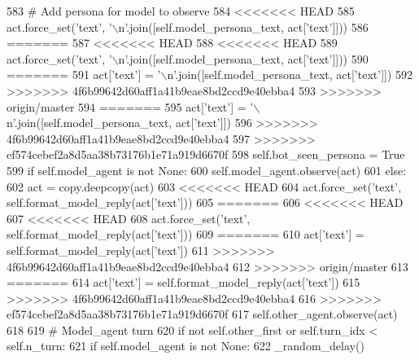\begin{DoxyCode}
583             \textcolor{comment}{# Add persona for model to observe}
584 <<<<<<< HEAD
585             act.force\_set(\textcolor{stringliteral}{'text'}, \textcolor{stringliteral}{'\(\backslash\)n'}.join([self.model\_persona\_text, act[\textcolor{stringliteral}{'text'}]]))
586 =======
587 <<<<<<< HEAD
588 <<<<<<< HEAD
589             act.force\_set(\textcolor{stringliteral}{'text'}, \textcolor{stringliteral}{'\(\backslash\)n'}.join([self.model\_persona\_text, act[\textcolor{stringliteral}{'text'}]]))
590 =======
591             act[\textcolor{stringliteral}{'text'}] = \textcolor{stringliteral}{'\(\backslash\)n'}.join([self.model\_persona\_text, act[\textcolor{stringliteral}{'text'}]])
592 >>>>>>> 4f6b99642d60aff1a41b9eae8bd2ccd9e40ebba4
593 >>>>>>> origin/master
594 =======
595             act[\textcolor{stringliteral}{'text'}] = \textcolor{stringliteral}{'\(\backslash\)n'}.join([self.model\_persona\_text, act[\textcolor{stringliteral}{'text'}]])
596 >>>>>>> 4f6b99642d60aff1a41b9eae8bd2ccd9e40ebba4
597 >>>>>>> ef574cebef2a8d5aa38b73176b1e71a919d6670f
598             self.bot\_seen\_persona = \textcolor{keyword}{True}
599         \textcolor{keywordflow}{if} self.model\_agent \textcolor{keywordflow}{is} \textcolor{keywordflow}{not} \textcolor{keywordtype}{None}:
600             self.model\_agent.observe(act)
601         \textcolor{keywordflow}{else}:
602             act = copy.deepcopy(act)
603 <<<<<<< HEAD
604             act.force\_set(\textcolor{stringliteral}{'text'}, self.format\_model\_reply(act[\textcolor{stringliteral}{'text'}]))
605 =======
606 <<<<<<< HEAD
607 <<<<<<< HEAD
608             act.force\_set(\textcolor{stringliteral}{'text'}, self.format\_model\_reply(act[\textcolor{stringliteral}{'text'}]))
609 =======
610             act[\textcolor{stringliteral}{'text'}] = self.format\_model\_reply(act[\textcolor{stringliteral}{'text'}])
611 >>>>>>> 4f6b99642d60aff1a41b9eae8bd2ccd9e40ebba4
612 >>>>>>> origin/master
613 =======
614             act[\textcolor{stringliteral}{'text'}] = self.format\_model\_reply(act[\textcolor{stringliteral}{'text'}])
615 >>>>>>> 4f6b99642d60aff1a41b9eae8bd2ccd9e40ebba4
616 >>>>>>> ef574cebef2a8d5aa38b73176b1e71a919d6670f
617             self.other\_agent.observe(act)
618 
619         \textcolor{comment}{# Model\_agent turn}
620         \textcolor{keywordflow}{if} \textcolor{keywordflow}{not} self.other\_first \textcolor{keywordflow}{or} self.turn\_idx < self.n\_turn:
621             \textcolor{keywordflow}{if} self.model\_agent \textcolor{keywordflow}{is} \textcolor{keywordflow}{not} \textcolor{keywordtype}{None}:
622                 \_random\_delay()

\end{DoxyCode}
